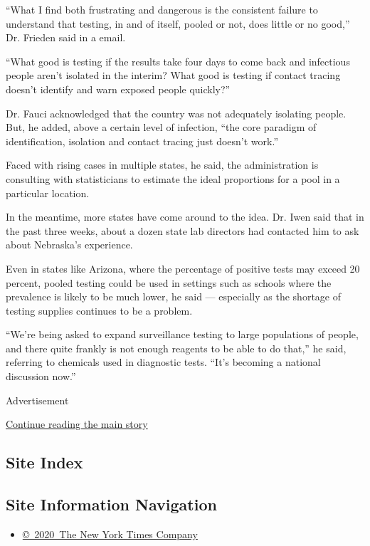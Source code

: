 ``What I find both frustrating and dangerous is the consistent failure
to understand that testing, in and of itself, pooled or not, does little
or no good,'' Dr. Frieden said in a email.

``What good is testing if the results take four days to come back and
infectious people aren't isolated in the interim? What good is testing
if contact tracing doesn't identify and warn exposed people quickly?''

Dr. Fauci acknowledged that the country was not adequately isolating
people. But, he added, above a certain level of infection, ``the core
paradigm of identification, isolation and contact tracing just doesn't
work.''

Faced with rising cases in multiple states, he said, the administration
is consulting with statisticians to estimate the ideal proportions for a
pool in a particular location.

In the meantime, more states have come around to the idea. Dr. Iwen said
that in the past three weeks, about a dozen state lab directors had
contacted him to ask about Nebraska's experience.

Even in states like Arizona, where the percentage of positive tests may
exceed 20 percent, pooled testing could be used in settings such as
schools where the prevalence is likely to be much lower, he said ---
especially as the shortage of testing supplies continues to be a
problem.

``We're being asked to expand surveillance testing to large populations
of people, and there quite frankly is not enough reagents to be able to
do that,'' he said, referring to chemicals used in diagnostic tests.
``It's becoming a national discussion now.''

Advertisement

\protect\hyperlink{after-bottom}{Continue reading the main story}

\hypertarget{site-index}{%
\subsection{Site Index}\label{site-index}}

\hypertarget{site-information-navigation}{%
\subsection{Site Information
Navigation}\label{site-information-navigation}}

\begin{itemize}
\tightlist
\item
  \href{https://help.nytimes3xbfgragh.onion/hc/en-us/articles/115014792127-Copyright-notice}{©~2020~The
  New York Times Company}
\end{itemize}

